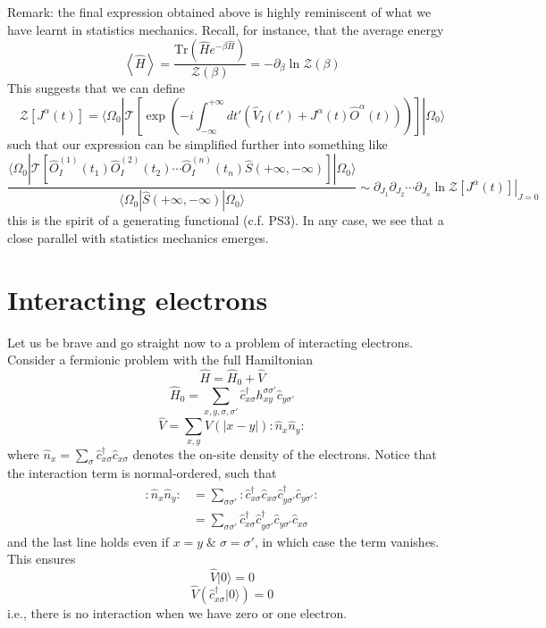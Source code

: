 Remark: the final expression obtained above is highly reminiscent of what we have learnt in statistics mechanics. Recall, for instance, that the average energy
\[ \left< \hat{H} \right> =\frac{\mathrm{Tr}\left( \hat{H}e^{-\beta \hat{H}} \right)}{\mathcal{Z} \left( \beta \right)}=-\partial _{\beta}\ln \mathcal{Z} \left( \beta \right) \]
This suggests that we can define
\[ \mathcal{Z} \left[ J^{\alpha}\left( t \right) \right] =\langle \Omega _0|\mathcal{T} \left[ \exp \left( -i\int_{-\infty}^{+\infty}{dt'\left( \hat{V}_I\left( t' \right) +J^{\alpha}\left( t \right) \hat{O}^{\alpha}\left( t \right) \right)} \right) \right] |\Omega _0\rangle \]
such that our expression can be simplified further into something like
\[ \frac{\langle \Omega _0|\mathcal{T} \left[ \hat{O}_{I}^{\left( 1 \right)}\left( t_1 \right) \hat{O}_{I}^{\left( 2 \right)}\left( t_2 \right) \cdots \hat{O}_{I}^{\left( n \right)}\left( t_n \right) \hat{S}\left( +\infty ,-\infty \right) \right] |\Omega _0\rangle}{\langle \Omega _0|\hat{S}\left( +\infty ,-\infty \right) |\Omega _0\rangle}\sim \left. \partial _{J_1}\partial _{J_2}\cdots \partial _{J_n}\ln \mathcal{Z} \left[ J^{\alpha}\left( t \right) \right] \right|_{J=0}\]
this is the spirit of a generating functional (c.f. PS3). In any case, we see that a close parallel with statistics mechanics emerges.

\section{Interacting electrons}

Let us be brave and go straight now to a problem of interacting electrons. Consider a fermionic problem with the full Hamiltonian
\[ \hat{H}=\hat{H}_0+\hat{V}\]
\[ \hat{H}_0=\sum_{x,y,\sigma ,\sigma '}{\hat{c}_{x\sigma}^{\dagger}h_{xy}^{\sigma \sigma '}\hat{c}_{y\sigma '}}\]
\[ \hat{V}=\sum_{x,y}{V\left( \left| x-y \right| \right) :\hat{n}_x\hat{n}_y:}\]
where $\hat{n}_x=\sum_{\sigma}{\hat{c}_{x\sigma}^{\dagger}\hat{c}_{x\sigma}}$ denotes the on-site density of the electrons. Notice that the interaction term is normal-ordered, such that
\begin{align*}
    :\hat{n}_x\hat{n}_y:&=\sum_{\sigma \sigma '}{:\hat{c}_{x\sigma}^{\dagger}\hat{c}_{x\sigma}\hat{c}_{y\sigma '}^{\dagger}\hat{c}_{y\sigma '}:}\\
    &=\sum_{\sigma \sigma '}{\hat{c}_{x\sigma}^{\dagger}\hat{c}_{y\sigma '}^{\dagger}\hat{c}_{y\sigma '}\hat{c}_{x\sigma}}
\end{align*}
and the last line holds even if $x=y\;\&\;\sigma=\sigma'$, in which case the term vanishes. This ensures
\[ \hat{V}|0\rangle =0\]
\[ \hat{V}\left( \hat{c}_{x\sigma}^{\dagger}|0\rangle \right) =0\]
i.e., there is no interaction when we have zero or one electron.

